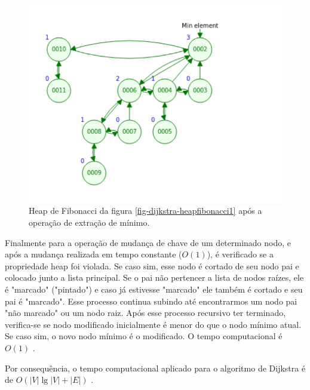 
\begin{figure}[H]
\centering
\includegraphics[width=.54\textwidth]{figuras/fibonacci-heap2} 
\caption{Heap de Fibonacci da figura \ref{fig-dijkstra-heapfibonacci1} após a operação de extração de mínimo.}
\label{fig-dijkstra-heapfibonacci2}
\end{figure}


Finalmente para a operação de mudança de chave de um determinado nodo, e após a mudança realizada em tempo constante ($O(1)$), é verificado se a propriedade heap foi violada. Se caso sim, esse nodo é cortado de seu nodo pai e colocado junto a lista principal. Se o pai não pertencer a lista de nodos raízes, ele é "marcado" ("pintado") e caso já estivesse "marcado" ele também é cortado e seu pai é "marcado". Esse processo continua subindo até encontrarmos um nodo pai "não marcado" ou um nodo raiz. Após esse processo recursivo ter terminado, verifica-se se nodo modificado inicialmente é menor do que o nodo mínimo atual. Se caso sim, o novo nodo mínimo é o modificado. O tempo computacional é $O(1)$ \cite{cormen2009introduction}.

Por consequência, o tempo computacional aplicado para o algoritmo de Dijkstra é de $O(|V|\lg |V| + |E|)$ \cite{cormen2009introduction}.